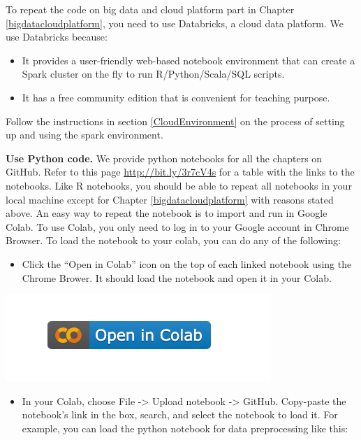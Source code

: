 \documentclass[
  12pt,
]{krantz}
\providecommand{\tightlist}{%
  \setlength{\itemsep}{0pt}\setlength{\parskip}{0pt}}
\begin{document}
To repeat the code on big data and cloud platform part in Chapter \ref{bigdatacloudplatform}, you need to use Databricks, a cloud data platform. We use Databricks because:

\begin{itemize}
\tightlist
\item
  It provides a user-friendly web-based notebook environment that can create a Spark cluster on the fly to run R/Python/Scala/SQL scripts.
\item
  It has a free community edition that is convenient for teaching purpose.
\end{itemize}

Follow the instructions in section \ref{CloudEnvironment} on the process of setting up and using the spark environment.

\textbf{Use Python code.} We provide python notebooks for all the chapters on GitHub. Refer to this page \url{http://bit.ly/3r7cV4s} for a table with the links to the notebooks. Like R notebooks, you should be able to repeat all notebooks in your local machine except for Chapter \ref{bigdatacloudplatform} with reasons stated above. An easy way to repeat the notebook is to import and run in Google Colab. To use Colab, you only need to log in to your Google account in Chrome Browser. To load the notebook to your colab, you can do any of the following:

\begin{itemize}
\tightlist
\item
  Click the ``Open in Colab'' icon on the top of each linked notebook using the Chrome Brower. It should load the notebook and open it in your Colab.
\end{itemize}

\begin{center}\includegraphics[width=0.35\linewidth]{images/colabicon} \end{center}

\begin{itemize}
\tightlist
\item
  In your Colab, choose File -\textgreater{} Upload notebook -\textgreater{} GitHub. Copy-paste the notebook's link in the box, search, and select the notebook to load it. For example, you can load the python notebook for data preprocessing like this:
\end{itemize}
\end{document}
